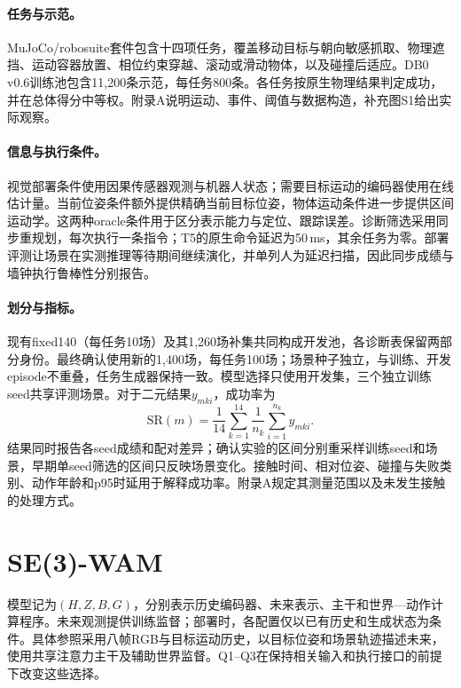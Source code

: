 \paragraph{任务与示范。}
MuJoCo/robosuite套件\cite{mujoco,robosuite}包含十四项任务，覆盖移动目标与朝向敏感抓取、物理遮挡、运动容器放置、相位约束穿越、滚动或滑动物体，以及碰撞后适应。DB0 v0.6训练池包含11,200条示范，每任务800条。各任务按原生物理结果判定成功，并在总体得分中等权。附录A说明运动、事件、阈值与数据构造，补充图S1给出实际观察。

\paragraph{信息与执行条件。}
视觉部署条件使用因果传感器观测与机器人状态；需要目标运动的编码器使用在线估计量。当前位姿条件额外提供精确当前目标位姿，物体运动条件进一步提供区间运动学。这两种oracle条件用于区分表示能力与定位、跟踪误差。诊断筛选采用同步重规划，每次执行一条指令；T5的原生命令延迟为50\,ms，其余任务为零。部署评测让场景在实测推理等待期间继续演化，并单列人为延迟扫描，因此同步成绩与墙钟执行鲁棒性分别报告。

\paragraph{划分与指标。}
现有fixed140（每任务10场）及其1,260场补集共同构成开发池，各诊断表保留两部分身份。最终确认使用新的1,400场，每任务100场；场景种子独立，与训练、开发episode不重叠，任务生成器保持一致。模型选择只使用开发集，三个独立训练seed共享评测场景。对于二元结果$y_{mki}$，成功率为
\begin{equation}
\mathrm{SR}(m)=\frac1{14}\sum_{k=1}^{14}
\frac1{n_k}\sum_{i=1}^{n_k}y_{mki}.
\end{equation}
结果同时报告各seed成绩和配对差异；确认实验的区间分别重采样训练seed和场景，早期单seed筛选的区间只反映场景变化。接触时间、相对位姿、碰撞与失败类别、动作年龄和p95时延用于解释成功率。附录A规定其测量范围以及未发生接触的处理方式。

\section{SE(3)-WAM}

模型记为$(H,Z,B,G)$，分别表示历史编码器、未来表示、主干和世界—动作计算程序。未来观测提供训练监督；部署时，各配置仅以已有历史和生成状态为条件。具体参照采用八帧RGB与目标运动历史，以目标位姿和场景轨迹描述未来，使用共享注意力主干及辅助世界监督。Q1--Q3在保持相关输入和执行接口的前提下改变这些选择。

